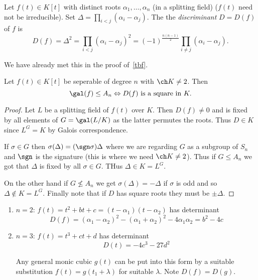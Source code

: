\documentclass[a4paper]{article}
\begin{document}
\begin{definition}[Discriminant]
  Let \(f(t) \in K[t]\) with distinct roots \(\alpha_1, \dots, \alpha_n\) (in a splitting field) (\(f(t)\) need not be irreducible). Set \(\Delta = \prod_{i < j}(\alpha_i - \alpha_j)\). The the \emph{discriminant} \(D = D(f)\) of \(f\) is
  \[
    D(f) = \Delta^2 = \prod_{i < j}(\alpha_i - \alpha_j)^2 = (-1)^{\frac{n(n-1)}{2}} \prod_{i \neq j}(\alpha_i - \alpha_j).
  \]
\end{definition}

\begin{remark}
  We have already met this in the proof of~\ref{tbf}.
\end{remark}

\begin{lemma}
  Let \(f(t) \in K[t]\) be seperable of degree \(n\) with \(\ch K \neq 2\). Then
  \[
    \gal(f) \leq A_n \Leftrightarrow D(f) \text{ is a square in } K.
  \]
\end{lemma}

\begin{proof}
  Let \(L\) be a splitting field of \(f(t)\) over \(K\). Then \(D(f) \neq 0\) and is fixed by all elements of \(G = \gal(L/K)\) as the latter permutes the roots. Thus \(D \in K\) since \(L^G = K\) by Galois correspondence.

  If \(\sigma \in G\) then \(\sigma(\Delta) = (\sgn \sigma) \Delta\) where we are regarding \(G\) as a subgroup of \(S_n\) and \(\sgn\) is the signature (this is where we need \(\ch K \neq 2\)). Thus if \(G \leq A_n\) we got that \(\Delta\) is fixed by all \(\sigma \in G\). THus \(\Delta \in K = L^G\).

  On the other hand if \(G \nleq A_n\) we get \(\sigma(\Delta) = -\Delta\) if \(\sigma\) is odd and so \(\Delta \notin K = L^G\). Finally note that if \(D\) has square roots they must be \(\pm \Delta\).
\end{proof}

\begin{eg}\leavevmode
  \begin{enumerate}
  \item \(n = 2\): \(f(t) =t^2 + bt + c = (t - \alpha_1)(t - \alpha_2)\) has determinant
    \[
      D(f) = (\alpha_1 - \alpha_2)^2 - (\alpha_1 + \alpha_2)^2 - 4\alpha_1\alpha_2 = b^2 - 4c
    \]
  \item \(n = 3\): \(f(t) = t^3 + ct + d\) has determinant
    \[
      D(t) = -4c^3 - 27d^2
   \]
   \begin{remark}
     Any general monic cubic \(g(t)\) can be put into this form by a suitable substitution \(f(t) = g(t_1 + \lambda)\) for suitable \(\lambda\). Note \(D(f) = D(g)\).
   \end{remark}
 \end{enumerate}
\end{eg}
\end{document}
